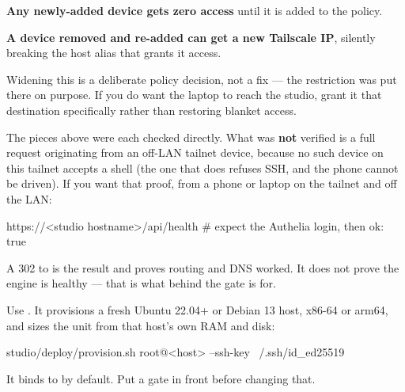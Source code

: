 \documentclass[fontpath=fonts/,logopath=logo/]{riposte-doc}
\begin{document}
\begin{ripbullets}
\item \textbf{Any newly-added device gets zero access} until it is added to the policy.
\item \textbf{A device removed and re-added can get a new Tailscale IP}, silently breaking the host alias that grants it access.
\end{ripbullets}

Widening this is a deliberate policy decision, not a fix — the restriction was put there on purpose. If you do want the laptop to reach the studio, grant it that destination specifically rather than restoring blanket access.



The pieces above were each checked directly. What was \textbf{not} verified is a full request originating from an off-LAN tailnet device, because no such device on this tailnet accepts a shell (the one that does refuses SSH, and the phone cannot be driven). If you want that proof, from a phone or laptop on the tailnet and off the LAN:

\ripcodeopen
{}
\begin{ripcodeblock}
https://<studio hostname>/api/health     # expect the Authelia login, then ok: true
\end{ripcodeblock}
\ripcodesizereset\ripcodeclose

A 302 to  is the  result and proves routing and DNS worked. It does not prove the engine is healthy — that is what  behind the gate is for.



Use . It provisions a fresh Ubuntu 22.04+ or Debian 13 host, x86-64 or arm64, and sizes the unit from that host's own RAM and disk:

\ripcodeopen
{}
\begin{ripcodeblock}
studio/deploy/provision.sh root@<host> --ssh-key ~/.ssh/id_ed25519
\end{ripcodeblock}
\ripcodesizereset\ripcodeclose

It binds to  by default. Put a gate in front before changing that.


\end{document}
